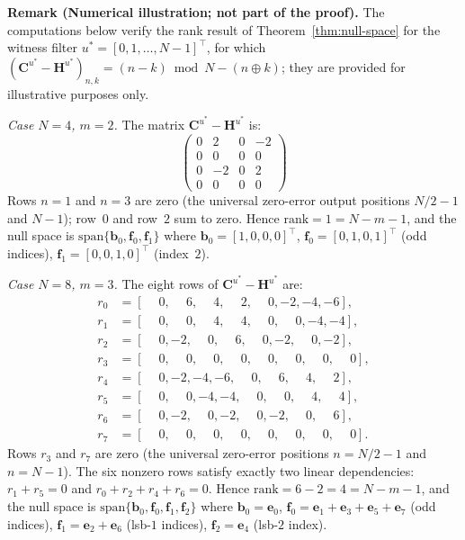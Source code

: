 \documentclass[10pt,a4paper]{amsart}
\begin{document}
\medskip

\noindent\textbf{Remark (Numerical illustration; not part of the proof).} The computations below verify the rank result of Theorem~\ref{thm:null-space} for the witness filter $u^* = [0,1,\ldots,N-1]^\top$, for which $(\mathbf{C}^{u^*}-\mathbf{H}^{u^*})_{n,k} = (n-k)\bmod N - (n\oplus k)$; they are provided for illustrative purposes only.


\smallskip
\noindent\textit{Case $N=4$, $m=2$.} The matrix $\mathbf{C}^{u^*}-\mathbf{H}^{u^*}$ is:
\[
\begin{pmatrix}
 0 &  2 & 0 & -2 \\
 0 &  0 & 0 &  0 \\
 0 & -2 & 0 &  2 \\
 0 &  0 & 0 &  0
\end{pmatrix}
\]
Rows $n=1$ and $n=3$ are zero (the universal zero-error output positions $N/2-1$ and $N-1$); row~$0$ and row~$2$ sum to zero. Hence $\mathrm{rank}=1=N-m-1$, and the null space is $\mathrm{span}\{\mathbf{b}_0,\mathbf{f}_0,\mathbf{f}_1\}$ where $\mathbf{b}_0=[1,0,0,0]^\top$, $\mathbf{f}_0=[0,1,0,1]^\top$ (odd indices), $\mathbf{f}_1=[0,0,1,0]^\top$ (index~$2$).

\smallskip
\noindent\textit{Case $N=8$, $m=3$.} The eight rows of $\mathbf{C}^{u^*}-\mathbf{H}^{u^*}$ are:
\begin{align*}
r_0 &= [\phantom{-}0,\phantom{-}6,\phantom{-}4,\phantom{-}2,\phantom{-}0,-2,-4,-6],\\
r_1 &= [\phantom{-}0,\phantom{-}0,\phantom{-}4,\phantom{-}4,\phantom{-}0,\phantom{-}0,-4,-4],\\
r_2 &= [\phantom{-}0,-2,\phantom{-}0,\phantom{-}6,\phantom{-}0,-2,\phantom{-}0,-2],\\
r_3 &= [\phantom{-}0,\phantom{-}0,\phantom{-}0,\phantom{-}0,\phantom{-}0,\phantom{-}0,\phantom{-}0,\phantom{-}0],\\
r_4 &= [\phantom{-}0,-2,-4,-6,\phantom{-}0,\phantom{-}6,\phantom{-}4,\phantom{-}2],\\
r_5 &= [\phantom{-}0,\phantom{-}0,-4,-4,\phantom{-}0,\phantom{-}0,\phantom{-}4,\phantom{-}4],\\
r_6 &= [\phantom{-}0,-2,\phantom{-}0,-2,\phantom{-}0,-2,\phantom{-}0,\phantom{-}6],\\
r_7 &= [\phantom{-}0,\phantom{-}0,\phantom{-}0,\phantom{-}0,\phantom{-}0,\phantom{-}0,\phantom{-}0,\phantom{-}0].
\end{align*}
Rows $r_3$ and $r_7$ are zero (the universal zero-error positions $n=N/2-1$ and $n=N-1$). The six nonzero rows satisfy exactly two linear dependencies: $r_1+r_5=0$ and $r_0+r_2+r_4+r_6=0$. Hence $\mathrm{rank}=6-2=4=N-m-1$, and the null space is $\mathrm{span}\{\mathbf{b}_0,\mathbf{f}_0,\mathbf{f}_1,\mathbf{f}_2\}$ where $\mathbf{b}_0=\mathbf{e}_0$, $\mathbf{f}_0=\mathbf{e}_1+\mathbf{e}_3+\mathbf{e}_5+\mathbf{e}_7$ (odd indices), $\mathbf{f}_1=\mathbf{e}_2+\mathbf{e}_6$ (lsb-$1$ indices), $\mathbf{f}_2=\mathbf{e}_4$ (lsb-$2$ index).
\end{document}
